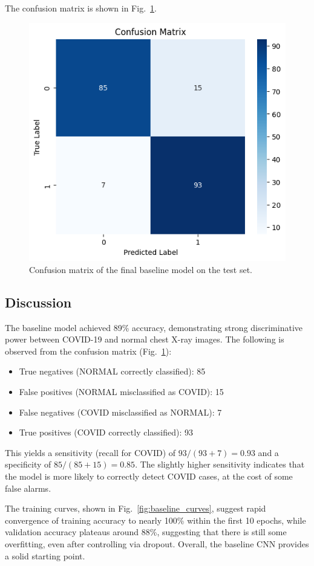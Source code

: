 \documentclass[conference]{IEEEtran}
\begin{document}
The confusion matrix is shown in Fig.~\ref{fig:conf_matrix}.

\begin{figure}[htbp]
	\centerline{\includegraphics[width=0.7\linewidth]{Images/confusion_matrix_baseline.png}}
	\caption{Confusion matrix of the final baseline model on the test set.}
	\label{fig:conf_matrix}
\end{figure}

\subsection{Discussion}
The baseline model achieved 89\% accuracy, demonstrating strong discriminative power between COVID-19 and normal chest X-ray images. The following is observed from the confusion matrix (Fig.~\ref{fig:conf_matrix}):

\begin{itemize}
	\item True negatives (NORMAL correctly classified): 85
	\item False positives (NORMAL misclassified as COVID): 15
	\item False negatives (COVID misclassified as NORMAL): 7
	\item True positives (COVID correctly classified): 93
\end{itemize}

This yields a sensitivity (recall for COVID) of $93/(93+7)=0.93$ and a specificity of $85/(85+15)=0.85$. The slightly higher sensitivity indicates that the model is more likely to correctly detect COVID cases, at the cost of some false alarms.  

The training curves, shown in Fig.~\ref{fig:baseline_curves}, suggest rapid convergence of training accuracy to nearly 100\% within the first 10 epochs, while validation accuracy plateaus around 88\%, suggesting that there is still some overfitting, even after controlling via dropout. Overall, the baseline CNN provides a solid starting point.
\end{document}
